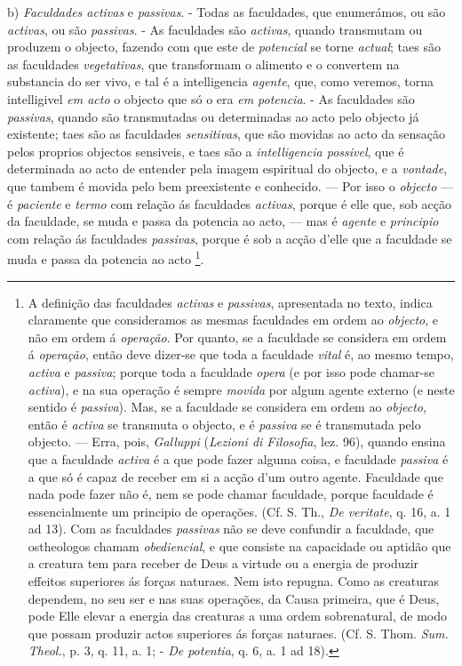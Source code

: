b) \emph{Faculdades activas} e \emph{passivas}. - Todas as faculdades, que enumerámos, ou são \emph{activas}, ou são \emph{passivas}. - As faculdades são \emph{activas}, quando transmutam ou produzem o objecto, fazendo com que este de \emph{potencial} se torne \emph{actual}; taes são as faculdades \emph{vegetativas}, que transformam o alimento e o convertem na substancia do ser vivo, e tal é a intelligencia \emph{agente}, que, como veremos, torna intelligivel \emph{em acto} o objecto que só o era \emph{em potencia}. - As faculdades são \emph{passivas}, quando são transmutadas ou determinadas ao acto pelo objecto já existente; taes são as faculdades \emph{sensitivas}, que são movidas ao acto da sensação pelos proprios objectos sensiveis, e taes são a \emph{intelligencia possivel}, que é determinada ao acto de entender pela imagem espiritual do objecto, e a \emph{vontade}, que tambem é movida pelo bem preexistente e conhecido. --- Por isso o \emph{objecto} --- é \emph{paciente} e \emph{termo} com relação ás faculdades \emph{activas}, porque é elle que, sob acção da faculdade, se muda e passa da potencia ao acto, --- mas é \emph{agente} e \emph{principio} com relação ás faculdades \emph{passivas}, porque é sob a acção d'elle que a faculdade se muda e passa da potencia ao acto \footnote{A definição das faculdades \emph{activas} e \emph{passivas}, apresentada no texto, indica claramente que consideramos as mesmas faculdades em ordem ao \emph{objecto}, e não em ordem á \emph{operação}. Por quanto, se a faculdade se considera em ordem á \emph{operação}, então deve dizer-se que toda a faculdade \emph{vital} é, ao mesmo tempo, \emph{activa} e \emph{passiva}; porque toda a faculdade \emph{opera} (e por isso pode chamar-se \emph{activa}), e na sua operação é sempre \emph{movida} por algum agente externo (e neste sentido é \emph{passiva}). Mas, se a faculdade se considera em ordem ao \emph{objecto}, então é \emph{activa} se transmuta o objecto, e é \emph{passiva} se é transmutada pelo objecto. --- Erra, pois, \emph{Galluppi} (\emph{Lezioni di Filosofia}, lez. 96), quando ensina que a faculdade \emph{activa} é a que pode fazer alguma coisa, e faculdade \emph{passiva} é a que só é capaz de receber em si a acção d'um outro agente. Faculdade que nada pode fazer não é, nem se pode chamar faculdade, porque faculdade é essencialmente um principio de operações. (Cf. S. Th., \emph{De veritate}, q. 16, a. 1 ad 13). Com as faculdades \emph{passivas} não se deve confundir a faculdade, que ostheologos chamam \emph{obediencial}, e que consiste na capacidade ou aptidão que a creatura tem para receber de Deus a virtude ou a energia de produzir effeitos superiores ás forças naturaes. Nem isto repugna. Como as creaturas dependem, no seu ser e nas suas operações, da Causa primeira, que é Deus, pode Elle elevar a energia das creaturas a uma ordem sobrenatural, de modo que possam produzir actos superiores ás forças naturaes. (Cf. S. Thom. \emph{Sum. Theol.}, p. 3, q. 11, a. 1; - \emph{De potentia}, q. 6, a. 1 ad 18).}.

